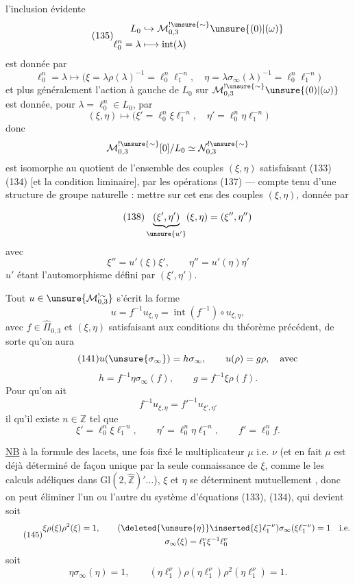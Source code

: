 
 l'inclusion évidente
\[
\tag{135}
\begin{aligned}
L_0&\hookrightarrow\mathcal M_{0,3}^{!\unsure{\sim}}\unsure{(0)|(\omega)}\\
\ell_0^n=\lambda&\longmapsto\operatorname{int}(\lambda)
\end{aligned}
\]
est donnée par
\[
\tag{136}
\ell_0^n=\lambda\longmapsto
\bigl(\xi=\lambda\rho(\lambda)^{-1}=\ell_0^n\ell_1^{-n},
\quad\eta=\lambda\sigma_\infty(\lambda)^{-1}=\ell_0^n\ell_1^{-n}\bigr)
\]
et plus généralement l'action à gauche de $L_0$ sur
$\mathcal M_{0,3}^{!\unsure{\sim}}\unsure{(0)|(\omega)}$ est donnée,
pour $\lambda=\ell_0^n\in L_0$, par
\[
\tag{137}
(\xi,\eta)\longmapsto
\bigl(\xi'=\ell_0^n\xi\ell_1^{-n},\quad
\eta'=\ell_0^n\eta\ell_1^{-n}\bigr)
\]
donc
\[
\mathcal M_{0,3}^{!\unsure{\sim}}[0]/L_0
\simeq\mathcal N_{0,3}^{!\unsure{\sim}}
\]
est isomorphe au quotient de l'ensemble des couples $(\xi,\eta)$
satisfaisant (133)(134) [et la condition liminaire], par les opérations
(137) --- compte tenu d'une 
structure de groupe naturelle : mettre sur cet ens des couples
$(\xi,\eta)$, donnée par


\[
\tag{138}
\underbrace{(\xi',\eta')}_{\unsure{u'}}(\xi,\eta)=(\xi'',\eta'')
\]
avec
\[
\tag{139}
\xi''=u'(\xi)\xi',\qquad \eta''=u'(\eta)\eta'
\]
$u'$ étant l'automorphisme défini par $(\xi',\eta')$.

\uline{} Tout $u\in\unsure{\mathcal M_{0,3}^{!\sim}}$ s'écrit  la forme
\[
\tag{140}
u=f^{-1}u_{\xi,\eta}=\operatorname{int}(f^{-1})\circ u_{\xi,\eta},
\]
avec $f\in\widehat{\Pi}_{0,3}$ et $(\xi,\eta)$ satisfaisant aux conditions du théorème précédent, de sorte qu'on aura
\[
\tag{141}
u(\unsure{\sigma_\infty})=h\sigma_\infty,\qquad u(\rho)=g\rho,\quad\text{avec}
\]
\[
\tag{142}
h=f^{-1}\eta\sigma_\infty(f),\qquad g=f^{-1}\xi\rho(f).
\]
Pour qu'on ait
\[
f^{-1}u_{\xi,\eta}=f'^{-1}u_{\xi',\eta'}
\]
il  qu'il existe $n\in\mathbb Z$ tel que
\[
\tag{144}
\xi'=\ell_0^n\xi\ell_1^{-n},\qquad
\eta'=\ell_0^n\eta\ell_1^{-n},\qquad f'=\ell_0^n f.
\]

\uline{NB}  à la formule des lacets, une fois fixé le multiplicateur $\mu$ i.e. $\nu$ (et en fait $\mu$ est déjà déterminé de façon unique par la seule connaissance de $\xi$, comme le  les calculs adéliques dans $\mathrm{Gl}(2,\widehat{\mathbb Z})'\ldots$), $\xi$ et $\eta$ se déterminent mutuellement , donc on peut éliminer l'un ou l'autre du système d'équations (133), (134), qui devient soit
\[
\tag{145}
\begin{gathered}
\xi\rho(\xi)\rho^2(\xi)=1,\qquad
(\deleted{\unsure{\eta}}\inserted{\xi}\ell_1^{-\nu})\sigma_\infty(\xi\ell_1^{-\nu})=1
\quad\text{i.e.}\\
\sigma_\infty(\xi)=\ell_1^\nu\xi^{-1}\ell_0^\nu
\end{gathered}
\]
soit
\[
\tag{146}
\eta\sigma_\infty(\eta)=1,\qquad
(\eta\ell_1^\nu)\rho(\eta\ell_1^\nu)\rho^2(\eta\ell_1^\nu)=1.
\]


